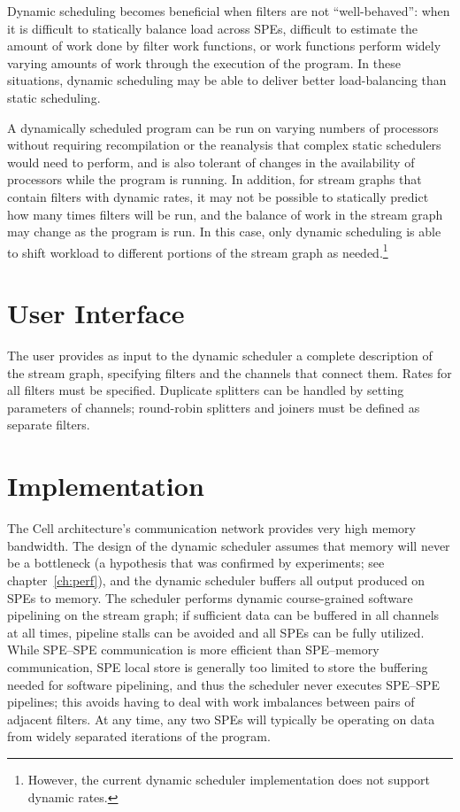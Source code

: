 Dynamic scheduling becomes beneficial when filters are not ``well-behaved'': when it is difficult to statically balance load across SPEs, difficult to estimate the amount of work done by filter work functions, or work functions perform widely varying amounts of work through the execution of the program. In these situations, dynamic scheduling may be able to deliver better load-balancing than static scheduling.

A dynamically scheduled program can be run on varying numbers of processors without requiring recompilation or the reanalysis that complex static schedulers would need to perform, and is also tolerant of changes in the availability of processors while the program is running. In addition, for stream graphs that contain filters with dynamic rates, it may not be possible to statically predict how many times filters will be run, and the balance of work in the stream graph may change as the program is run. In this case, only dynamic scheduling is able to shift workload to different portions of the stream graph as needed.\footnote{However, the current dynamic scheduler implementation does not support dynamic rates.}

\section{User Interface}\label{ch:ds:ui}

The user provides as input to the dynamic scheduler a complete description of the stream graph, specifying filters and the channels that connect them. Rates for all filters must be specified. Duplicate splitters can be handled by setting parameters of channels; round-robin splitters and joiners must be defined as separate filters.

\section{Implementation}\label{ch:ds:imp}

The Cell architecture's communication network provides very high memory bandwidth. The design of the dynamic scheduler assumes that memory will never be a bottleneck (a hypothesis that was confirmed by experiments; see chapter~\ref{ch:perf}), and the dynamic scheduler buffers all output produced on SPEs to memory. The scheduler performs dynamic course-grained software pipelining on the stream graph; if sufficient data can be buffered in all channels at all times, pipeline stalls can be avoided and all SPEs can be fully utilized. While SPE--SPE communication is more efficient than SPE--memory communication, SPE local store is generally too limited to store the buffering needed for software pipelining, and thus the scheduler never executes SPE--SPE pipelines; this avoids having to deal with work imbalances between pairs of adjacent filters. At any time, any two SPEs will typically be operating on data from widely separated iterations of the program.

